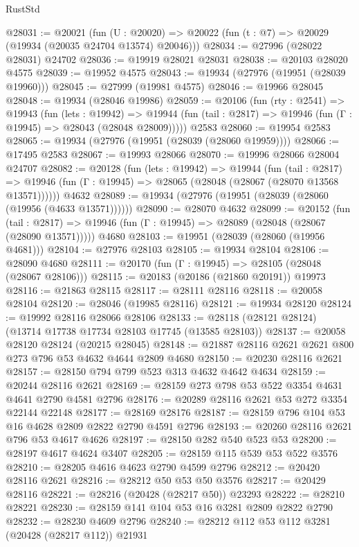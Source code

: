 \begin{lexlean}{RustStd}
\begin{coremodule}
@28031 := @20021
    (fun (U : @20020) => @20022 (fun (t : @7) => @20029 (@19934 (@20035 @24704 @13574) @20046)))
@28034 := @27996 (@28022 @28031) @24702
@28036 := @19919 @28021 @28031
@28038 := @20103 @28020 @4575
@28039 := @19952 @4575
@28043 := @19934 (@27976 (@19951 (@28039 @19960)))
@28045 := @27999 (@19981 @4575)
@28046 := @19966 @28045
@28048 := @19934 (@28046 @19986)
@28059 := @20106
    (fun (rty : @2541) =>
    @19943
      (fun (lets : @19942) =>
      @19944 (fun (tail : @2817) => @19946 (fun (Γ : @19945) => @28043 (@28048 @28009)))))
    @2583
@28060 := @19954 @2583
@28065 := @19934 (@27976 (@19951 (@28039 (@28060 @19959))))
@28066 := @17495 @2583
@28067 := @19993 @28066
@28070 := @19996 @28066 @28004 @24707
@28082 := @20128
    (fun (lets : @19942) =>
    @19944
      (fun (tail : @2817) =>
      @19946 (fun (Γ : @19945) => @28065 (@28048 (@28067 (@28070 @13568 @13571))))))
    @4632
@28089 := @19934 (@27976 (@19951 (@28039 (@28060 (@19956 (@4633 @13571))))))
@28090 := @28070 @4632
@28099 := @20152
    (fun (tail : @2817) => @19946 (fun (Γ : @19945) => @28089 (@28048 (@28067 (@28090 @13571)))))
    @4680
@28103 := @19951 (@28039 (@28060 (@19956 @4681)))
@28104 := @27976 @28103
@28105 := @19934 @28104
@28106 := @28090 @4680
@28111 := @20170 (fun (Γ : @19945) => @28105 (@28048 (@28067 @28106)))
@28115 := @20183 (@20186 (@21860 @20191)) @19973
@28116 := @21863 @28115
@28117 := @28111 @28116
@28118 := @20058 @28104
@28120 := @28046 (@19985 @28116)
@28121 := @19934 @28120
@28124 := @19992 @28116 @28066 @28106
@28133 := @28118 (@28121 @28124) (@13714 @17738 @17734 @28103 @17745 (@13585 @28103))
@28137 := @20058 @28120 @28124 (@20215 @28045)
@28148 := @21887 @28116 @2621 @2621 @800 @273 @796 @53 @4632 @4644 @2809 @4680
@28150 := @20230 @28116 @2621
@28157 := @28150 @794 @799 @523 @313 @4632 @4642 @4634
@28159 := @20244 @28116 @2621
@28169 := @28159 @273 @798 @53 @522 @3354 @4631 @4641 @2790 @4581 @2796
@28176 := @20289 @28116 @2621 @53 @272 @3354 @22144 @22148
@28177 := @28169 @28176
@28187 := @28159 @796 @104 @53 @16 @4628 @2809 @2822 @2790 @4591 @2796
@28193 := @20260 @28116 @2621 @796 @53 @4617 @4626
@28197 := @28150 @282 @540 @523 @53
@28200 := @28197 @4617 @4624 @3407
@28205 := @28159 @115 @539 @53 @522 @3576
@28210 := @28205 @4616 @4623 @2790 @4599 @2796
@28212 := @20420 @28116 @2621
@28216 := @28212 @50 @53 @50 @3576
@28217 := @20429 @28116
@28221 := @28216 (@20428 (@28217 @50)) @23293
@28222 := @28210 @28221
@28230 := @28159 @141 @104 @53 @16 @3281 @2809 @2822 @2790
@28232 := @28230 @4609 @2796
@28240 := @28212 @112 @53 @112 @3281 (@20428 (@28217 @112)) @21931

\end{coremodule}
\end{lexlean}
